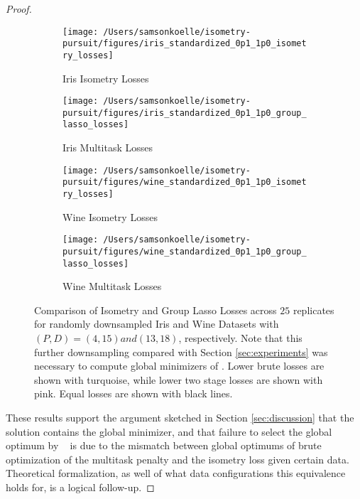 \begin{proof}
\begin{figure}[t] %
    \centering
    \begin{subfigure}[b]{0.45\textwidth}
        \centering
        \texttt{[image: /Users/samsonkoelle/isometry-pursuit/figures/iris\_standardized\_0p1\_1p0\_isometry\_losses]}
        \caption{Iris Isometry Losses}
        \label{fig:iris_isometry_losses}
    \end{subfigure}
    \hfill
    \begin{subfigure}[b]{0.45\textwidth}
        \centering
        \texttt{[image: /Users/samsonkoelle/isometry-pursuit/figures/iris\_standardized\_0p1\_1p0\_group\_lasso\_losses]}
        \caption{Iris Multitask Losses}
        \label{fig:iris_group_lasso_losses}
    \end{subfigure}

    \vspace{0.5cm} %

    \begin{subfigure}[b]{0.45\textwidth}
        \centering
        \texttt{[image: /Users/samsonkoelle/isometry-pursuit/figures/wine\_standardized\_0p1\_1p0\_isometry\_losses]}
        \caption{Wine Isometry Losses}
        \label{fig:wine_isometry_losses}
    \end{subfigure}
    \hfill
    \begin{subfigure}[b]{0.45\textwidth}
        \centering
        \texttt{[image: /Users/samsonkoelle/isometry-pursuit/figures/wine\_standardized\_0p1\_1p0\_group\_lasso\_losses]}
        \caption{Wine Multitask Losses}
        \label{fig:wine_group_lasso_losses}
    \end{subfigure}

    \caption{Comparison of Isometry and Group Lasso Losses across $25$ replicates for randomly downsampled Iris and Wine Datasets with $(P,D) = (4,15) and (13, 18)$, respectively.
    Note that this further downsampling compared with Section \ref{sec:experiments} was necessary to compute global minimizers of \brute.
    Lower brute losses are shown with turquoise, while lower two stage losses are shown with pink.
    Equal losses are shown with black lines.}
    \label{fig:comparison_losses}
\end{figure}

These results support the argument sketched in Section \ref{sec:discussion} that the \isometrypursuit~ solution contains the global minimizer, and that failure to select the global optimum by \tsip~ is due to the mismatch between global optimums of brute optimization of the multitask penalty and the isometry loss given certain data.
Theoretical formalization, as well of what data configurations this equivalence holds for, is a logical follow-up.

\end{proof}

